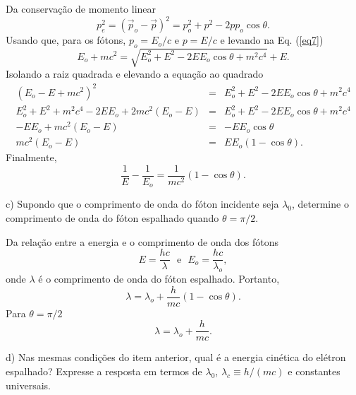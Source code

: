 \begin{enumerate}[start=1,label={\bfseries Q\arabic*.}]
\resposta Da conservação de momento linear
%
\begin{equation}
  p_{e}^{2} = (\vec{p}_{o} - \vec{p})^{2} = p_{o}^{2} + p^{2} - 2pp_{o} \cos \theta .
\end{equation}
%
Usando que, para os fótons, $p_{o} = E_{o}/c$ e $p = E/c$ e levando na Eq. (\ref{eq7})
%
\begin{equation}
  E_{o} + mc^{2} = \sqrt{E_{o}^{2} + E^{2} - 2E E_{o} \cos \theta + m^{2} c^{4}} + E .
\end{equation}
%
Isolando a raiz quadrada e elevando a equação ao quadrado
%
\begin{equation}
  \begin{array}{rcl}
    (E_{o} - E + mc^{2})^{2} & = & E_{o}^{2} + E^{2} - 2 E E_{o} \cos \theta + m^{2} c^{4} \\
    E_{o}^{2} + E^{2} + m^{2} c^{4} - 2 E E_{o} + 2 m c^{2} (E_{o} - E) & = & E_{o}^{2} + E^{2} - 2 E E_{o} \cos \theta + m^{2} c^{4} \\
    - E E_{o} + mc^{2} (E_{o} - E) & = & - E E_{o} \cos \theta \\
    m c^{2} (E_{o} - E) & = & E E_{o} (1 - \cos \theta) .
  \end{array}
\end{equation}
%
Finalmente,
%
\begin{equation}\label{eq8}
  \frac{1}{E} - \frac{1}{E_{o}} = \frac{1}{mc^{2}} (1 - \cos \theta) .
\end{equation}


c) Supondo que o comprimento de onda do fóton incidente seja $\lambda_{0}$, determine o comprimento de onda do fóton espalhado quando $\theta = \pi/2$.

\resposta Da relação entre a energia e o comprimento de onda dos fótons
%
\begin{equation}
  E = \frac{hc}{\lambda} \ \ \ \mbox{e} \ \ \ E_{o} = \frac{hc}{\lambda_{o}},
\end{equation}
%
onde $\lambda$ é o comprimento de onda do fóton espalhado. Portanto,
\begin{equation}
  \lambda = \lambda_{o} + \frac{h}{mc} (1 - \cos \theta) .
\end{equation}
%
Para $\theta = \pi/2$
%
\begin{equation}
  \lambda = \lambda_{o} + \frac{h}{mc} .
\end{equation}



d) Nas mesmas condições do item anterior, qual é a energia cinética do elétron espalhado? Expresse a resposta em termos de $\lambda_{0}$, $\lambda_{c} \equiv h / (mc)$ e constantes universais.


\end{enumerate}
